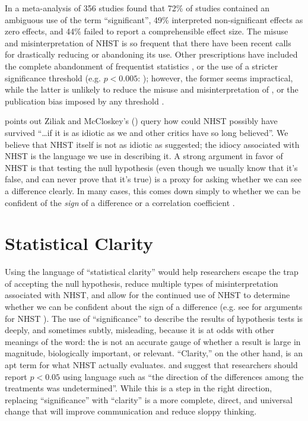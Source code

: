 In a meta-analysis of 356 studies \citet{Bernardietal.2017} found that 72\% of studies contained an ambiguous use of the term ``significant'', 49\% interpreted non-significant effects as zero effects, and 44\% failed to report a comprehensible effect size. The misuse and misinterpretation of NHST is so frequent that there have been recent calls for drastically reducing \citep{SzucsandIoannidis2017} or abandoning \citep{McShaneetal.2017} its use. Other prescriptions have included the complete abandonment of frequentist statistics , or the use of a stricter significance threshold (e.g. $p < 0.005$: \citealt{Benjaminetal.2018}); however, the former seems impractical, while the latter is unlikely to reduce the misuse and misinterpretation of \pvals, or the publication bias imposed by any \pval threshold \citep{Ridleyetal.2007}.

\citet{Kramer2011} points out Ziliak and McCloskey's (\citeyear{ZiliakandMcCloskey2008}) query how could NHST possibly have survived ``\ldots if it is as idiotic as we and other critics have so long believed''. We believe that NHST itself  is not as idiotic as suggested; the idiocy associated with NHST is the language we use in describing it. A strong argument in favor of NHST is that testing the null hypothesis (even though we usually know that it's false, and can never prove that it's true) is a proxy for asking whether we can see a difference clearly. In many cases, this comes down simply to whether we can be confident of the \emph{sign} of a difference or a correlation coefficient \citep{robinson2001past}. 

\section*{Statistical Clarity}

Using the language of ``statistical clarity'' would help researchers escape the trap of accepting the null hypothesis, reduce multiple types of misinterpretation associated with NHST, and allow for the continued use of NHST to determine whether we can be confident about the sign of a difference (e.g. see \citealt{Abelson1997} for arguments for NHST ). The use of ``significance'' to describe the results of hypothesis tests is deeply, and sometimes subtly, misleading, because it is at odds with other meanings of the word: the \pval is not an accurate gauge of whether a result is large in magnitude, biologically important, or relevant. ``Clarity,'' on the other hand, is an apt term for what NHST actually evaluates. \citet{jones2000sensible} and \citet{robinson2001past} suggest that researchers should report $p < 0.05$ using language such as ``the direction of the differences among the treatments was undetermined''. While this is a step in the right direction, replacing ``significance'' with ``clarity'' is a more complete, direct, and universal change that will improve communication and reduce sloppy thinking.

